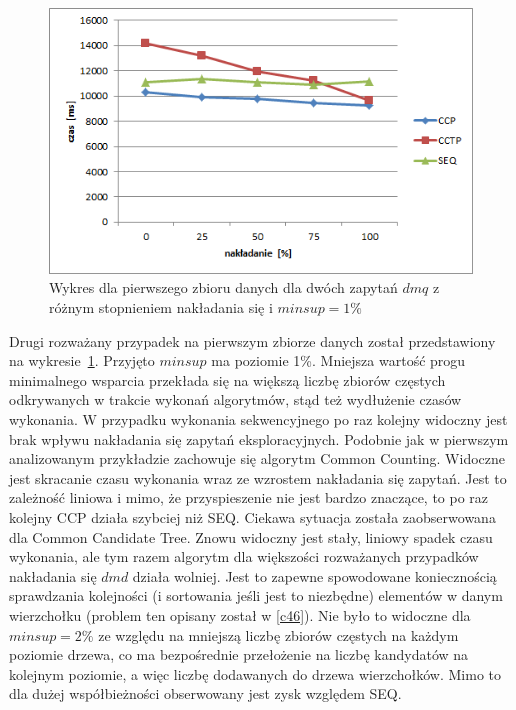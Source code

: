 \begin{figure}[h]
	\centering
	\includegraphics[width=0.8\linewidth]{figures/chart_100_1}
	\caption{Wykres dla pierwszego zbioru danych dla dwóch zapytań \(dmq\) z różnym stopnieniem nakładania się i \(minsup = 1\%\)}
	\label{fig:chart_100_1}
\end{figure}
Drugi rozważany przypadek na pierwszym zbiorze danych został przedstawiony na wykresie~\ref{fig:chart_100_1}. Przyjęto \(minsup\) ma poziomie 1\%. Mniejsza wartość progu minimalnego wsparcia przekłada się na większą liczbę zbiorów częstych odkrywanych w trakcie wykonań algorytmów, stąd też wydłużenie czasów wykonania. W przypadku wykonania sekwencyjnego po raz kolejny widoczny jest brak wpływu nakładania się zapytań eksploracyjnych. Podobnie jak w pierwszym analizowanym przykładzie zachowuje się algorytm Common Counting. Widoczne jest skracanie czasu wykonania wraz ze wzrostem nakładania się zapytań. Jest to zależność liniowa i mimo, że przyspieszenie nie jest bardzo znaczące, to po raz kolejny CCP działa szybciej niż SEQ. Ciekawa sytuacja została zaobserwowana dla Common Candidate Tree. Znowu widoczny jest stały, liniowy spadek czasu wykonania, ale tym razem algorytm dla większości rozważanych przypadków nakładania się \(dmd\) działa wolniej. Jest to zapewne spowodowane koniecznością sprawdzania kolejności (i sortowania jeśli jest to niezbędne) elementów w danym wierzchołku (problem ten opisany został w \ref{c46}). Nie było to widoczne dla \(minsup = 2\%\) ze względu na mniejszą liczbę zbiorów częstych na każdym poziomie drzewa, co ma bezpośrednie przełożenie na liczbę kandydatów na kolejnym poziomie, a więc liczbę dodawanych do drzewa wierzchołków. Mimo to dla dużej współbieżności obserwowany jest zysk względem SEQ. 


